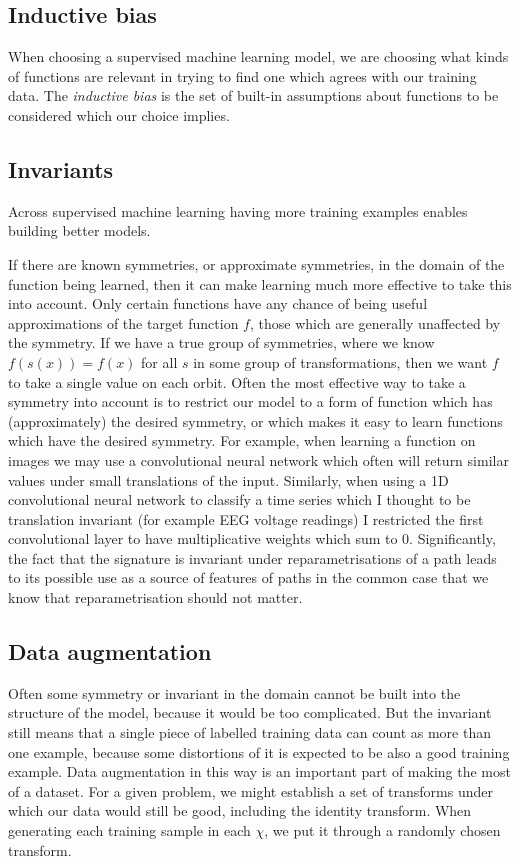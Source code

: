 \subsection{Inductive bias}
When choosing a supervised machine learning model, we are choosing what kinds of functions are relevant in trying to find one which agrees with our training data.
The \emph{inductive bias} is the set of built-in assumptions about functions to be considered which our choice implies.

\subsection{Invariants}
\label{sec:invariants}
Across supervised machine learning having more training examples enables building better models. 

If there are known symmetries, or approximate symmetries, in the domain of the function being learned, then it can make learning much more effective to take this into account. Only certain functions have any chance of being useful approximations of the target function $f$, those which are generally unaffected by the symmetry. If we have a true group of symmetries, where we know $f(s(x))=f(x)$ for all $s$ in some group of transformations, then we want $f$ to take a single value on each orbit. 
Often the most effective way to take a symmetry into account is to restrict our model to a form of function which has (approximately) the desired symmetry, or which makes it easy to learn functions which have the desired symmetry.
For example, when learning a function on images we may use a convolutional neural network which often will return similar values under small translations of the input.
Similarly, when using a 1D convolutional neural network to classify a time series which I thought to be translation invariant (for example EEG voltage readings) I restricted the first convolutional layer to have multiplicative weights which sum to 0.
Significantly, the fact that the signature is invariant under reparametrisations of a path leads to its possible use as a source of features of paths in the common case that we know that reparametrisation should not matter.

\subsection{Data augmentation}
Often some symmetry or invariant in the domain cannot be built into the structure of the model, because it would be too complicated.
But the invariant still means that a single piece of labelled training data can count as more than one example, because some distortions of it is expected to be also a good training example.
Data augmentation in this way is an important part of making the most of a dataset.
For a given problem, we might establish a set of transforms under which our data would still be good, including the identity transform. When generating each training sample in each $\chi$, we put it through a randomly chosen transform.

